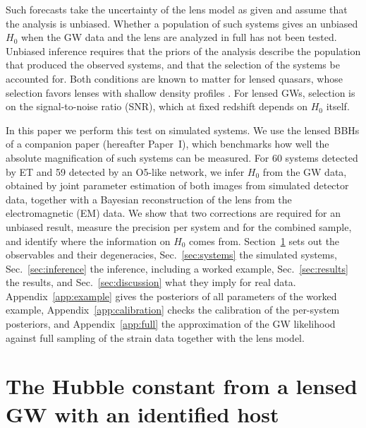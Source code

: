 Such forecasts take the uncertainty of the lens model as given and assume that the analysis is unbiased. Whether a population of such systems gives an unbiased $H_0$ when the GW data and the lens are analyzed in full has not been tested. Unbiased inference requires that the priors of the analysis describe the population that produced the observed systems, and that the selection of the systems be accounted for. Both conditions are known to matter for lensed quasars, whose selection favors lenses with shallow density profiles \citep{collett2016selection,li2024selection}. For lensed GWs, selection is on the signal-to-noise ratio (SNR), which at fixed redshift depends on $H_0$ itself.

In this paper we perform this test on simulated systems. We use the lensed BBHs of a companion paper \citep{paper1} (hereafter Paper~I), which benchmarks how well the absolute magnification of such systems can be measured. For 60 systems detected by ET and 59 detected by an O5-like network, we infer $H_0$ from the GW data, obtained by joint parameter estimation of both images from simulated detector data, together with a Bayesian reconstruction of the lens from the electromagnetic (EM) data. We show that two corrections are required for an unbiased result, measure the precision per system and for the combined sample, and identify where the information on $H_0$ comes from. Section~\ref{sec:principle} sets out the observables and their degeneracies, Sec.~\ref{sec:systems} the simulated systems, Sec.~\ref{sec:inference} the inference, including a worked example, Sec.~\ref{sec:results} the results, and Sec.~\ref{sec:discussion} what they imply for real data. Appendix~\ref{app:example} gives the posteriors of all parameters of the worked example, Appendix~\ref{app:calibration} checks the calibration of the per-system posteriors, and Appendix~\ref{app:full} the approximation of the GW likelihood against full sampling of the strain data together with the lens model.

\section{The Hubble constant from a lensed GW with an identified host}
\label{sec:principle}
